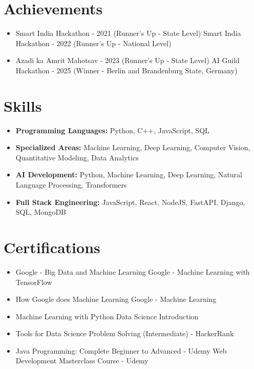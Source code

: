 \documentclass[a4paper,10pt]{article}
\begin{document}
\section*{Achievements}
\begin{itemize}
\item Smart India Hackathon - 2021 (Runner's Up - State Level) \hfill Smart India Hackathon - 2022 (Runner's Up - National Level)
\item Azadi ka Amrit Mahotsav - 2023 (Runner's Up - State Level) \hfill AI Guild Hackathon - 2025 (Winner - Berlin and Brandenburg State, Germany)
\end{itemize}

\section*{Skills}
\begin{itemize}
  \item \textbf{Programming Languages:} Python, C++, JavaScript, SQL
  \item \textbf{Specialized Areas:} Machine Learning, Deep Learning, Computer Vision, Quantitative Modeling, Data Analytics
  \item \textbf{AI Development:} Python, Machine Learning, Deep Learning, Natural Language Processing, Transformers
  \item \textbf{Full Stack Engineering:} JavaScript, React, NodeJS, FastAPI, Django, SQL, MongoDB
\end{itemize}

\section*{Certifications}
\begin{itemize}
\item Google - Big Data and Machine Learning \hfill Google - Machine Learning with TensorFlow
\item How Google does Machine Learning \hfill Google - Machine Learning
\item Machine Learning with Python \hfill Data Science Introduction
\item Tools for Data Science \hfill Problem Solving (Intermediate) - HackerRank
\item Java Programming: Complete Beginner to Advanced - Udemy \hfill Web Development Masterclass Course - Udemy
\end{itemize}
\end{document}

